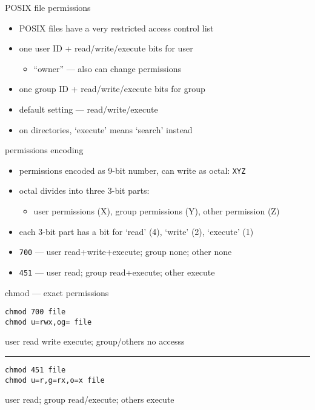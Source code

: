 \begin{frame}{POSIX file permissions}
    \begin{itemize}
    \item POSIX files have a very restricted access control list
    \vspace{.5cm}
    \item one user ID + read/write/execute bits for user
        \begin{itemize}
        \item ``owner'' --- also can change permissions
        \end{itemize}
    \item one group ID + read/write/execute bits for group
    \item default setting --- read/write/execute
    \vspace{.5cm}
    \item on directories, `execute' means `search' instead
    \end{itemize}
\end{frame}

\begin{frame}{permissions encoding}
\begin{itemize}
    \item permissions encoded as 9-bit number, can write as octal: \texttt{XYZ}
    \item octal divides into three 3-bit parts:
        \begin{itemize}
        \item user permissions (X), group permissions (Y), other permission (Z)
        \end{itemize}
    \item each 3-bit part has a bit for `read' (4), `write' (2), `execute' (1)
    \vspace{.5cm}
    \item \texttt{700} --- user read+write+execute; group none; other none
    \item \texttt{451} --- user read; group read+execute; other execute
\end{itemize}
\end{frame}

\begin{frame}[fragile]{chmod --- exact permissions}
\begin{Verbatim}
chmod 700 file
chmod u=rwx,og= file
\end{Verbatim}
user read write execute; group/others no accesss
    \vspace{.1cm}
\hrule
\begin{Verbatim}
chmod 451 file
chmod u=r,g=rx,o=x file
\end{Verbatim}
user read; group read/execute; others execute
\end{frame}

